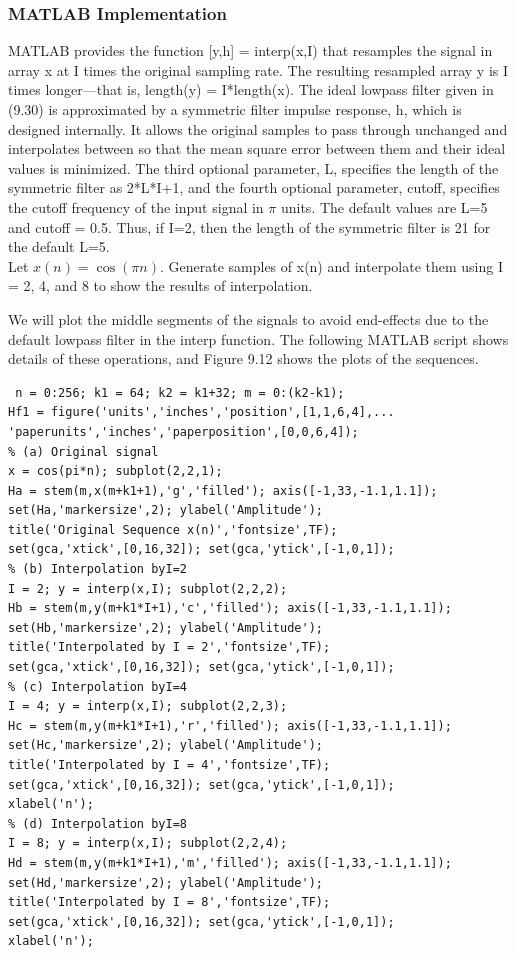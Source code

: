 \documentclass{article}
\begin{document}
\subsubsection{MATLAB Implementation }
MATLAB provides the function [y,h] =
interp(x,I) that resamples the signal in array x at I times the original
sampling rate. The resulting resampled array y is I times longer—that
is, length(y) = I*length(x). The ideal lowpass filter given in (9.30) is
approximated by a symmetric filter impulse response, h, which is designed
internally. It allows the original samples to pass through unchanged and
interpolates between so that the mean square error between them and
their ideal values is minimized. The third optional parameter, L, specifies
the length of the symmetric filter as 2*L*I+1, and the fourth optional
parameter, cutoff, specifies the cutoff frequency of the input signal in $\pi$
units. The default values are L=5 and cutoff = 0.5. Thus, if I=2,
then the length of the symmetric filter is 21 for the default L=5. \\
\vspace{1em}
Let $x(n) = \cos(\pi n)$. Generate samples of x(n) and interpolate them using I = 2,
4, and 8 to show the results of interpolation. 
\begin{center}
We will plot the middle segments of the signals to avoid end-effects due to
the default lowpass filter in the interp function. The following MATLAB
script shows details of these operations, and Figure 9.12 shows the plots of the
sequences.
\end{center}
\begin{lstlisting}
 n = 0:256; k1 = 64; k2 = k1+32; m = 0:(k2-k1);
Hf1 = figure('units','inches','position',[1,1,6,4],...
'paperunits','inches','paperposition',[0,0,6,4]);
% (a) Original signal
x = cos(pi*n); subplot(2,2,1);
Ha = stem(m,x(m+k1+1),'g','filled'); axis([-1,33,-1.1,1.1]);
set(Ha,'markersize',2); ylabel('Amplitude');
title('Original Sequence x(n)','fontsize',TF);
set(gca,'xtick',[0,16,32]); set(gca,'ytick',[-1,0,1]);
% (b) Interpolation byI=2
I = 2; y = interp(x,I); subplot(2,2,2);
Hb = stem(m,y(m+k1*I+1),'c','filled'); axis([-1,33,-1.1,1.1]);
set(Hb,'markersize',2); ylabel('Amplitude');
title('Interpolated by I = 2','fontsize',TF);
set(gca,'xtick',[0,16,32]); set(gca,'ytick',[-1,0,1]);
% (c) Interpolation byI=4
I = 4; y = interp(x,I); subplot(2,2,3);
Hc = stem(m,y(m+k1*I+1),'r','filled'); axis([-1,33,-1.1,1.1]);
set(Hc,'markersize',2); ylabel('Amplitude');
title('Interpolated by I = 4','fontsize',TF);
set(gca,'xtick',[0,16,32]); set(gca,'ytick',[-1,0,1]);
xlabel('n');
% (d) Interpolation byI=8
I = 8; y = interp(x,I); subplot(2,2,4);
Hd = stem(m,y(m+k1*I+1),'m','filled'); axis([-1,33,-1.1,1.1]);
set(Hd,'markersize',2); ylabel('Amplitude');
title('Interpolated by I = 8','fontsize',TF);
set(gca,'xtick',[0,16,32]); set(gca,'ytick',[-1,0,1]);
xlabel('n');
\end{lstlisting}
\end{document}

